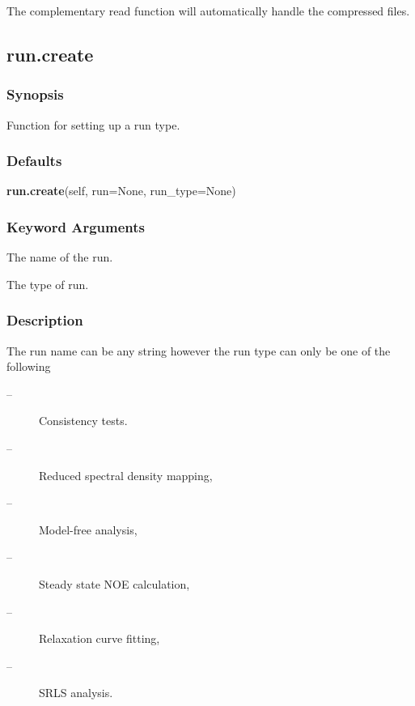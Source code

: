  The complementary read function will automatically handle the compressed files. 
  

  

 \newpage 

 \subsection{run.create} 

  
 \subsubsection{Synopsis} 

 Function for setting up a run type. 
  

  
 \subsubsection{Defaults} 

 \textsf{\textbf{run.create}(self, run=None, run\_type=None)} 

  
 \subsubsection{Keyword Arguments} 

   The name of the run.   

   The type of run.  

  

  
 \subsubsection{Description} 

 The run name can be any string however the run type can only be one of the following 
  

 \begin{description} 
 \item[ --]  Consistency tests.  
 \item[ --]  Reduced spectral density mapping,  
 \item[ --]  Model-free analysis,  
 \item[ --]  Steady state NOE calculation,  
 \item[ --]  Relaxation curve fitting,  
 \item[ --]  SRLS analysis.  
 \end{description} 
  

